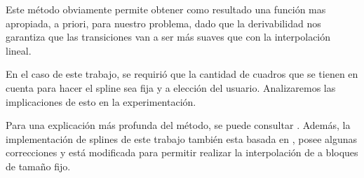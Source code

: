 Este método obviamente permite obtener como resultado una función mas apropiada, a priori, para nuestro problema, dado que la derivabilidad nos garantiza que las transiciones van a ser más suaves que con la interpolación lineal.

En el caso de este trabajo, se requirió que la cantidad de cuadros que se tienen en cuenta para hacer el spline sea fija y a elección del usuario. Analizaremos las implicaciones de esto en la experimentación.

Para una explicación más profunda del método, se puede consultar \cite{burden}. Además, la implementación de splines de este trabajo también esta basada en \cite{burden}, posee algunas correcciones y está modificada para permitir realizar la interpolación de a bloques de tamaño fijo.





